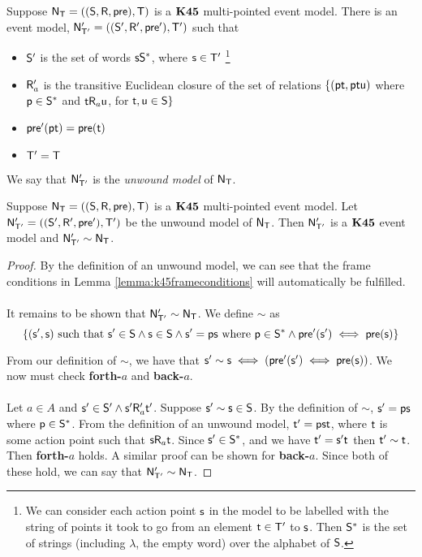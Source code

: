 \begin{defn}\label{def:unwoundModel}
  Suppose $\evM_\evT = ((\evS,\evR,\evpr),\evT)$ is a $\AXKFF$ multi-pointed
  event model.
  There is an event model, $\evM'_{\evT'} = ((\evS',\evR',\evpr'),\evT')$ such that
  \begin{itemize}
		\item $\evS'$ is the set of words $\evs \evS^\ast$, where $\evs \in \evT'$
			\footnote{We can consider each action point $\evs$ in the model to be labelled with the string of
			points it took to go from an element $\evt \in \evT'$ to $\evs$.
			Then $\evS^\ast$ is the set of strings (including $\lambda$, the empty word) over the alphabet 
			of $\evS$.}
		\item $\evR'_a$ is the transitive Euclidean closure of the set of relations $\{(\evp \evt,
			\evp \evt \evu)$ where $\evp \in \evS^\ast$ and $\evt \evR_a \evu$, for $\evt, \evu \in \evS \}$
		\item $\evpr'(\evp \evt) = \evpr(\evt)$
		\item $\evT' = \evT$
  \end{itemize}
  We say that $\evM'_{\evT'}$ is the {\em unwound model} of $\evM_\evT$.
\end{defn}

\begin{lemma} \label{lemma:unwoundModel:bisimilar}
  Suppose $\evM_\evT = ((\evS,\evR,\evpr),\evT)$ is a $\AXKFF$ multi-pointed
  event model.
	Let $\evM'_{\evT'} = ((\evS',\evR',\evpr'),\evT')$ be the unwound model of $\evM_\evT$.
	Then $\evM'_{\evT'}$ is a $\AXKFF$ event model and $\evM'_{\evT'} \sim \evM_\evT$.
\end{lemma}
\begin{proof}
	By the definition of an unwound model, we can see that the frame conditions in Lemma 
	\ref{lemma:k45frameconditions} will automatically be fulfilled.\\
	\\
	It remains to be shown that $\evM'_{\evT'} \sim \evM_\evT$.
	We define $\sim$ as
	\[
		\{(\evs',\evs) \text{ such that } \evs' \in \evS \land \evs \in \evS \land \evs' = \evp \evs
			\text{ where } \evp \in \evS^\ast \land \evpr'(\evs') \iff \evpr(\evs) \}
	\]

	From our definition of $\sim$, we have that $\evs' \sim \evs \iff (\evpr'(\evs') \iff
	\evpr(\evs))$.
	We now must check {\bf forth-$a$} and {\bf back-$a$}.\\
	\\
	Let $a \in A$ and $\evs' \in \evS' \land \evs' \evR'_a \evt'$.
	Suppose $\evs' \sim \evs \in \evS$.
	By the definition of $\sim$, $\evs' = \evp \evs$ where $\evp \in \evS^\ast$.
	From the definition of an unwound model, $\evt' = \evp \evs \evt$, where $\evt$ is some action
	point such that $\evs \evR_a \evt$.
	Since $\evs' \in \evS^\ast$, and we have $\evt' = \evs' \evt$ then $\evt' \sim \evt$.
	Then {\bf forth-$a$} holds.
	A similar proof can be shown for {\bf back-$a$}.
	Since both of these hold, we can say that $\evM'_{\evT'} \sim \evM_\evT$.
\end{proof}

